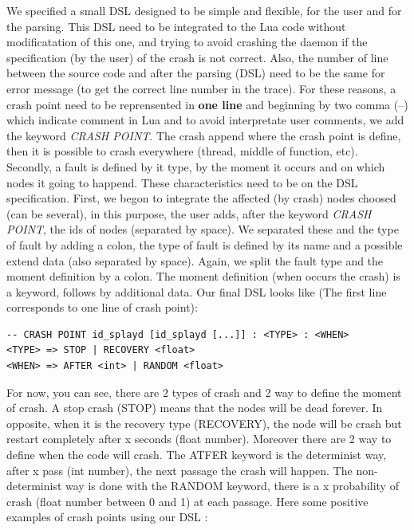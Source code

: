 \documentclass{eplmastersthesis}
\begin{document}
          We specified a small DSL designed to be simple and flexible, for the user and for the parsing. This DSL need to
          be integrated to the Lua code without modificatation of this one, and trying to avoid crashing the
          daemon if the specification (by the user) of the crash is not correct. Also, the number of line between the
          source code and after the parsing (DSL) need to be the same for error message (to get the correct line number in the trace).
          For these reasons, a crash point need to be reprensented in \textbf{one line} and beginning by two comma (--) which
          indicate comment in Lua and to avoid interpretate user comments, we add the keyword \textit{CRASH POINT}.
          The crash append where the crash point is define, then it is possible to
          crash everywhere (thread, middle of function, etc). \\

          Secondly, a fault is defined by it type, by the moment it occurs and on which nodes it going to happend.
          These characteristics need to be on the DSL specification. First, we begon to integrate the affected (by crash) nodes choosed
          (can be several), in this purpose, the user adds, after the keyword \textit{CRASH POINT},
          the ids of nodes (separated by space). We separated these and the type of fault by adding a colon, the type
          of fault is defined by its name and a possible extend data (also separated by space). Again, we split the
          fault type and the moment definition by a colon. The moment definition (when occurs the crash) is a keyword, follows
          by additional data. Our final DSL looks like (The first line corresponds to one line of crash point):
          \begin{lstlisting}[style=MyBash]
-- CRASH POINT id_splayd [id_splayd [...]] : <TYPE> : <WHEN>
<TYPE> => STOP | RECOVERY <float>
<WHEN> => AFTER <int> | RANDOM <float>
          \end{lstlisting}
          For now, you can see, there are 2 types of crash and 2 way to define the moment of crash. A stop crash (STOP) means that
          the nodes will be dead forever. In opposite, when it is the recovery type (RECOVERY), the node will be crash but restart
          completely after x seconds (float number). Moreover there are 2 way to define when the code will crash. The ATFER keyword
          is the determinist way, after x pass (int number), the next passage the crash will happen. The non-determinist way is
          done with the RANDOM keyword, there is a x probability of crash (float number between 0 and 1) at each passage.
          Here some positive examples of crash points using our DSL :
\end{document}
